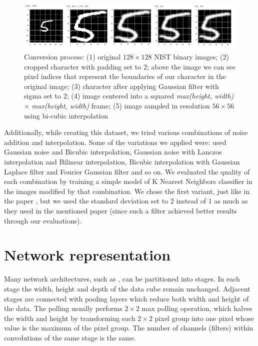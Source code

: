 \documentclass[eng]{simposium}
\begin{document}
\begin{figure}[!ht] 
  \includegraphics[width=1\textwidth]{conversion.png} 
  \centering 
  \caption{Conversion process:  
(1) original $128 \times 128$ NIST binary images;  
(2) cropped character with padding set to $2$; above the image we can see pixel indices that represent the boundaries of our character in the original image;  
(3) character after applying Gaussian filter with sigma set to $2$;  
(4) image centered into a squared \textit{max(height, width)} $\times$ \textit{max(height, width)} frame;  
(5) image sampled in resolution $56 \times 56$ using bi-cubic interpolation} 
  \label{fig:conversion} 
\end{figure} 

Additionally, while creating this dataset, we tried various combinations of noise addition and interpolation.  
Some of the variations we applied were: used Gaussian noise and Bicubic interpolation, Gaussian noise with Lanczos interpolation  
and Bilinear interpolation, Bicubic interpolation with Gaussian Laplace filter and Fourier Gaussian filter and so on.  
We evaluated the quality of each combination by training a simple model of K Nearest Neighbors classifier in the images modified by that  
combination. We chose the first variant, just like in the paper \cite{1}, but we used the standard deviation set to $2$  
instead of $1$ as much as they used in the mentioned paper (since such a filter achieved better results through our evaluations).  

\section{Network representation} 
\label{sec:repr} 

Many network architectures, such as \cite{6,7}, can be partitioned into stages. 
In each stage the width, height and depth of the data cube remain unchanged.  
Adjacent stages are connected with pooling layers which reduce both width and height of the data. 
The polling usually performs $2 \times 2$ max polling operation, which halves the width and height by transforming each $2 \times 2$  
pixel group into one pixel whose value is the maximum of the pixel group. 
The number of channels (filters) within convolutions of the same stage is the same. 
\end{document}
